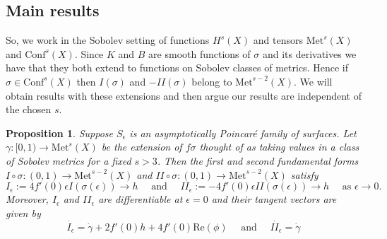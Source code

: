 \documentclass{amsart}
\newtheorem{prop}[thm]{Proposition}
\newcommand{\two}{I\!\!I}
\begin{document}
\subsection{Main results}



So, we work in the Sobolev setting of functions $H^s(X)$ and tensors $\mathrm{Met}^s(X)$ and $\mathrm{Conf}^s(X)$.
Since $K$ and $B$ are smooth functions of $\sigma$ and its derivatives we have that they both extend to functions on Sobolev classes of metrics.
Hence if $\sigma \in \mathrm{Conf}^s(X)$ then $I(\sigma)$ and $-\two(\sigma)$ belong to $\mathrm{Met}^{s-2}(X)$.
We will obtain results with these extensions and then argue our results are independent of the chosen $s$. 



\begin{prop}
\label{thm-in-sobolev}
Suppose $S_\epsilon$ is an asymptotically Poincar\'e family of surfaces. 
Let $\gamma : [0,1) \to \mathrm{Met}^s(X)$ be the extension of $f\sigma$ thought of as taking values in a class of Sobolev metrics for a fixed $s > 3$. 
Then the first and second fundamental forms $I \circ \sigma: (0,1) \to \mathrm{Met}^{s-2}(X)$ and  $\two \circ \sigma: (0,1) \to \mathrm{Met}^{s-2}(X)$ satisfy
\[
I_\epsilon := 4 f'(0) \epsilon I(\sigma(\epsilon)) \to h
\quad \text{ and } \quad
\two_\epsilon :=  - 4 f'(0) \epsilon \two(\sigma(\epsilon)) \to h
\quad \text{ as } \epsilon \to 0.
\]
Moreover, $I_\epsilon$ and $\two_\epsilon$ are differentiable at $\epsilon = 0$ and their tangent vectors are given by 
\[
\dot{I_\epsilon} = \dot{\gamma} + 2 f'(0) h + 4 f'(0) \mathrm{Re}(\phi)
\quad \text{ and } \quad
\dot{\two_\epsilon} = \dot{\gamma}
\]
\end{prop}
\end{document}
